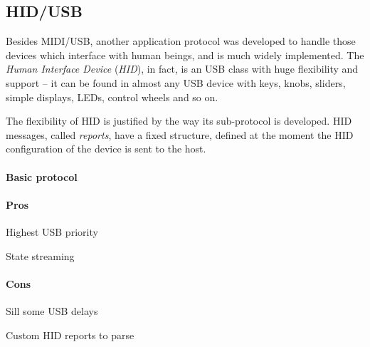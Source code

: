 \documentclass[a4paper,10pt]{article}
\begin{document}
\begin{multicols}{2}
\subsection{HID/USB}

Besides MIDI/USB, another application protocol was developed to handle those
devices which interface with human beings, and is much widely implemented.
The \emph{Human Interface Device} (\emph{HID}), in fact, is an USB class
with huge flexibility and support -- it can be found in almost any USB device
with keys, knobs, sliders, simple displays, LEDs, control wheels and so on.

The flexibility of HID is justified by the way its sub-protocol is developed.
HID messages, called \emph{reports}, have a fixed structure, defined at the
moment the HID configuration of the device is sent to the host.

\TODO


\paragraph{Basic protocol}
\TODO


\paragraph{Pros}
\begin{itemize*}
	\item Highest USB priority
	\item State streaming
	\item \TODO
\end{itemize*}


\paragraph{Cons}
\begin{itemize*}
	\item Sill some USB delays
	\item Custom HID reports to parse
	\item \TODO
\end{itemize*}





\end{multicols}
\end{document}
